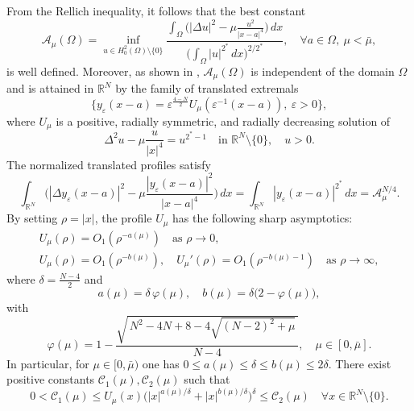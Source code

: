 \documentclass[10pt,a4paper]{amsart}
\numberwithin{equation}{section}
\begin{document}
From the Rellich inequality, it follows that the best constant
\begin{equation}\label{A}
\mathcal{A}_{\mu}(\Omega)
=\inf_{u\in H^2_0(\Omega)\setminus\{0\}}
\frac{\int_{\Omega}\Big(|\Delta u|^2-\mu\frac{u^2}{|x-a|^4}\Big)\,dx}
{\Big(\int_{\Omega}|u|^{2^*}\,dx\Big)^{2/2^*}},\quad \forall a\in\Omega,\ \mu<\bar\mu,
\end{equation}
is well defined.
Moreover, as shown in \cite{j1,K}, \(\mathcal{A}_\mu(\Omega)\) is independent of the
domain \(\Omega\) and is attained in \(\mathbb{R}^N\) by the family of translated
extremals
\[
\{y_{\varepsilon}(x-a)=\varepsilon^{\frac{4-N}{2}}
U_{\mu}(\varepsilon^{-1}(x-a)), \ \varepsilon>0\},
\]
where \(U_\mu\) is a positive, radially symmetric, and radially decreasing solution
of
\[
\Delta^2 u-\mu\frac{u}{|x|^4}=u^{2^*-1}\quad\text{in }\mathbb{R}^N\setminus\{0\},
\quad u>0.
\]
The normalized translated profiles satisfy
\[
\int_{\mathbb{R}^N}\Big(|\Delta y_{\varepsilon}(x-a)|^{2}
-\mu\frac{|y_{\varepsilon}(x-a)|^{2}}{|x-a|^{4}}\Big)\,dx
=\int_{\mathbb{R}^N}|y_{\varepsilon}(x-a)|^{2^*}\,dx
=\mathcal{A}_{\mu}^{N/4}.
\]
By setting \(\rho=|x|\), the profile \(U_\mu\) has the following sharp
asymptotics:
\begin{gather*}
U_\mu(\rho) = O_1(\rho^{-a(\mu)}) \quad\text{as }\rho \to 0,\\
U_\mu(\rho) = O_1(\rho^{-b(\mu)}), \quad
U_\mu'(\rho) = O_1(\rho^{-b(\mu)-1}) \quad\text{as }\rho \to \infty,
\end{gather*}
where \( \delta=\tfrac{N-4}{2}\) and
\[
a(\mu)=\delta\,\varphi(\mu),\quad b(\mu)=\delta\big(2-\varphi(\mu)\big),
\]
with
\[
\varphi(\mu)=1-\frac{\sqrt{\,N^2-4N+8-4\sqrt{(N-2)^2+\mu}\,}}{N-4},\quad
\mu\in[0,\bar\mu].
\]
In particular, for \(\mu\in[0,\bar\mu)\) one has
\(0\le a(\mu)\le\delta\le b(\mu)\le 2\delta\). There exist positive constants
\(\mathcal{C}_1(\mu),\mathcal{C}_2(\mu)\) such that
\[
0<\mathcal{C}_1(\mu)\le U_\mu(x)\big(|x|^{a(\mu)/\delta}+|x|^{b(\mu)/\delta}\big)^\delta\le\mathcal{C}_2(\mu)
\quad\forall x\in\mathbb{R}^N\setminus\{0\}.
\]
\end{document}
